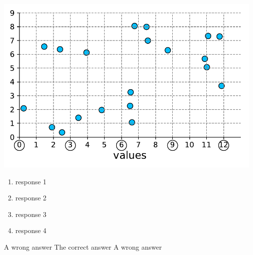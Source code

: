 \documentclass[11pt]{exam}
\begin{document}
\begin{questions}
\begin{minipage}[l]{0.45\textwidth}
\begin{tabular}{c|c|c|c|c|c}
  \end{tabular}
\end{minipage}
\hfill
\begin{minipage}[r]{0.55\textwidth}
      \includegraphics[width=\textwidth]{../figs/fig1.pdf}
\end{minipage}
\vspace{2em}


	\begin{enumerate}
		\item response 1
 		\item response 2
 		\item response 3
 		\item response 4
	\end{enumerate}
\vspace{2em}

	\begin{choices}
 		\choice A wrong answer
 		\CorrectChoice The correct answer
 		\choice A wrong answer
	\end{choices}
\vspace{2em}


\end{questions}
\end{document}
